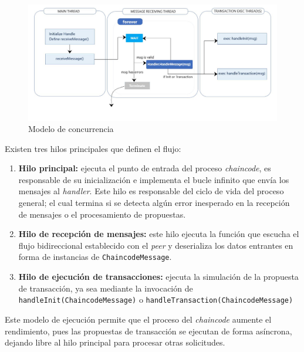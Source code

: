 \begin{figure}[tbph]
\centering
\includegraphics[width=\textwidth]{Images/threads}
\caption{Modelo de concurrencia}
\label{fig:concurrencyModel}
\end{figure}

Existen tres hilos principales que definen el flujo:

\begin{enumerate}
\item \textbf{Hilo principal:} ejecuta el punto de entrada del proceso \textit{chaincode}, es responsable de su inicialización e implementa el bucle infinito que envía los mensajes al \textit{handler}. Este hilo es responsable del ciclo de vida del proceso general; el cual termina si se detecta algún error inesperado en la recepción de mensajes o el procesamiento de propuestas.

\item \textbf{Hilo de recepción de mensajes:} este hilo ejecuta la función que escucha el flujo bidireccional establecido con el \textit{peer} y deserializa los datos entrantes en forma de instancias de \texttt{ChaincodeMessage}. 


\item \textbf{Hilo de ejecución de transacciones:} ejecuta la simulación de la propuesta de transacción, ya sea mediante la invocación de \texttt{handleInit(ChaincodeMessage)} o \texttt{handleTransaction(ChaincodeMessage)}

\end{enumerate}
Este modelo de ejecución permite que el proceso del \textit{chaincode} aumente el rendimiento, pues las propuestas de transacción se ejecutan de forma asíncrona, dejando libre al hilo principal para procesar otras solicitudes.


